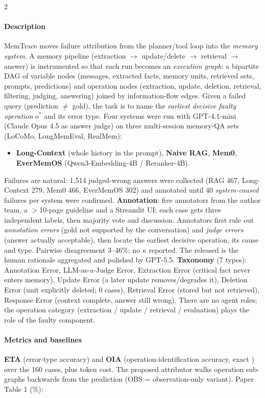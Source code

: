 \begin{multicols}{2}
\paragraph{Description} MemTrace moves failure attribution from the planner/tool loop into the \emph{memory system}. A memory pipeline (extraction $\to$ update/delete $\to$ retrieval $\to$ answer) is instrumented so that each run becomes an \emph{execution graph}: a bipartite DAG of variable nodes (messages, extracted facts, memory units, retrieved sets, prompts, predictions) and operation nodes (extraction, update, deletion, retrieval, filtering, judging, answering) joined by information-flow edges. Given a failed query (prediction $\neq$ gold), the task is to name the \emph{earliest decisive faulty operation} $o^*$ and its error type. Four systems were run with GPT-4.1-mini (Claude Opus 4.5 as answer judge) on three multi-session memory-QA sets (LoCoMo, LongMemEval, RealMem):
\begin{itemize}
\item \textbf{Long-Context} (whole history in the prompt), \textbf{Naive RAG}, \textbf{Mem0}, \textbf{EverMemOS} (Qwen3-Embedding-4B / Reranker-4B).
\end{itemize}
Failures are natural: 1,514 judged-wrong answers were collected (RAG 467, Long-Context 279, Mem0 466, EverMemOS 302) and annotated until 40 \emph{system-caused} failures per system were confirmed. \textbf{Annotation}: five annotators from the author team, a $>$10-page guideline and a Streamlit UI; each case gets three independent labels, then majority vote and discussion. Annotators first rule out \emph{annotation errors} (gold not supported by the conversation) and \emph{judge errors} (answer actually acceptable), then locate the earliest decisive operation, its cause and type. Pairwise disagreement 3--46\%; no $\kappa$ reported. The released  is the human rationale aggregated and polished by GPT-5.5. \textbf{Taxonomy} (7 types): Annotation Error, LLM-as-a-Judge Error, Extraction Error (critical fact never enters memory), Update Error (a later update removes/degrades it), Deletion Error (unit explicitly deleted; 0 cases), Retrieval Error (stored but not retrieved), Response Error (context complete, answer still wrong). There are no agent roles; the operation category (extraction / update / retrieval / evaluation) plays the role of the faulty component.

\paragraph{Metrics and baselines} \textbf{ETA} (error-type accuracy) and \textbf{OIA} (operation-identification accuracy, exact ) over the 160 cases, plus token cost. The proposed attributor walks operation sub-graphs backwards from the prediction (OBS = observation-only variant). Paper Table 1 (\%):


\end{multicols}
